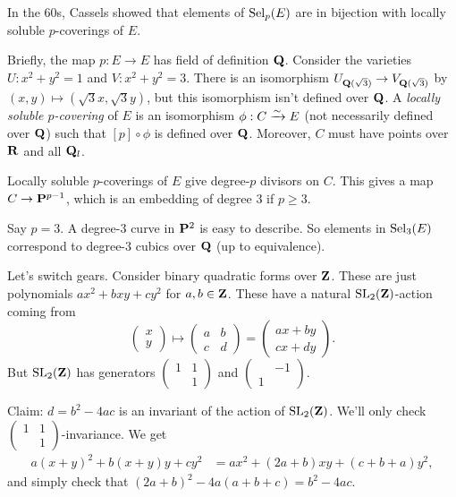 In the 60s, Cassels showed that elements of $\operatorname{Sel}_p(E)$ are in bijection 
with locally soluble $p$-coverings of $E$. 

Briefly, the map $p:E\to E$ has field of definition $\mathbf{Q}$. Consider the varieties 
$U:x^2+y^2=1$ and $V:x^2+y^2=3$. There is an isomorphism 
$U_{\mathbf{Q}(\sqrt 3)} \to V_{\mathbf{Q}(\sqrt 3)}$ by $(x,y)\mapsto (\sqrt 3x,\sqrt 3 y)$, 
but this isomorphism isn't defined over $\mathbf{Q}$. A \emph{locally soluble 
$p$-covering} of $E$ is an isomorphism $\phi:C\xrightarrow\sim E$ (not necessarily 
defined over $\mathbf{Q}$) such that $[p]\circ \phi$ is defined over $\mathbf{Q}$. Moreover, 
$C$ must have points over $\mathbf{R}$ and all $\mathbf{Q}_l$. 

Locally soluble $p$-coverings of $E$ give degree-$p$ divisors on $C$. This 
gives a map $C\to \mathbf{P}^{p-1}$, which is an embedding of degree $3$ if 
$p\geqslant 3$. 

Say $p=3$. A degree-$3$ curve in $\mathbf{P}^2$ is easy to describe. So elements in 
$\operatorname{Sel}_3(E)$ correspond to degree-$3$ cubics over $\mathbf{Q}$ (up to equivalence). 

Let's switch gears. Consider binary quadratic forms over $\mathbf{Z}$. These are just 
polynomials $a x^2+b x y+c y^2$ for $a,b\in \mathbf{Z}$. These have a natural 
$\operatorname{SL}_2(\mathbf{Z})$-action coming from 
\[
  \begin{pmatrix} x \\ y \end{pmatrix} \mapsto \begin{pmatrix} a & b \\ c & d \end{pmatrix} = \begin{pmatrix} a x+b y \\ c x+d y \end{pmatrix} .
\]
But $\operatorname{SL}_2(\mathbf{Z})$ has generators $\begin{pmatrix} 1 & 1 \\ & 1 \end{pmatrix}$ and 
$\begin{pmatrix} & -1 \\ 1 \end{pmatrix}$. 

Claim: $d=b^2-4 a c$ is an invariant of the action of $\operatorname{SL}_2(\mathbf{Z})$. We'll only 
check $\begin{pmatrix} 1 & 1 \\ & 1 \end{pmatrix}$-invariance. We get 
\begin{align*}
  a(x+y)^2+b (x+y)y+c y^2 
    &= a x^2 + (2 a+b)x y + (c+b+a) y^2 ,
\end{align*}
and simply check that $(2 a+b)^2 - 4 a(a+b+c)=b^2-4 a c$. 

